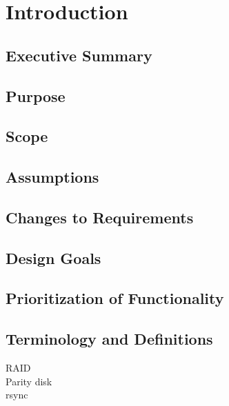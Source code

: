 \documentclass{report}
\begin{document}

\tableofcontents
\listoffigures

\chapter{Introduction} %
\label{ch:introduction}

\section{Executive Summary}

\section{Purpose}

\section{Scope}

\section{Assumptions}

\section{Changes to Requirements}

\section{Design Goals}

\section{Prioritization of Functionality}

\section{Terminology and Definitions}
\begin{description}
\item[RAID]
\item[Parity disk]
\item[rsync]
\end{description}

\end{document}
